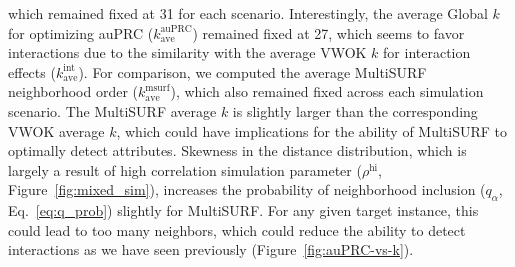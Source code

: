 \documentclass[10pt,letterpaper]{article}
\begin{document}
which remained fixed at 31 for each scenario. Interestingly, the average Global $k$ for optimizing auPRC ($k^\text{auPRC}_\text{ave}$) remained fixed at 27, which seems to favor interactions due to the similarity with the average VWOK $k$ for interaction effects ($k^\text{int}_\text{ave}$). For comparison, we computed the average MultiSURF neighborhood order ($k^\text{msurf}_\text{ave}$), which also remained fixed across each simulation scenario. The MultiSURF average $k$ is slightly larger than the corresponding VWOK average $k$, which could have implications for the ability of MultiSURF to optimally detect attributes. Skewness in the distance distribution, which is largely a result of high correlation simulation parameter ($\rho^\text{hi}$, Figure~\ref{fig:mixed_sim}), increases the probability of neighborhood inclusion ($q_\alpha$, Eq.~\ref{eq:q_prob}) slightly for MultiSURF. For any given target instance, this could lead to too many neighbors, which could reduce the ability to detect interactions as we have seen previously (Figure~\ref{fig:auPRC-vs-k}).
\end{document}
